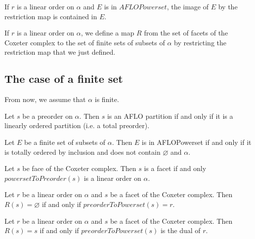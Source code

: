 \begin{sublemma}
If $r$ is a linear order on $\alpha$ and $E$ is in $AFLOPowerset$, the image of $E$ by the restriction map is contained in $E$.

\end{sublemma}

\begin{subdefi}[R]
If $r$ is a linear order on $\alpha$, we define a map $R$ from the set of facets of the Coxeter complex to the set of finite sets of
subsets of $\alpha$ by restricting the restriction map that we just defined.

\end{subdefi}


\subsection{The case of a finite set}

From now, we assume that $\alpha$ is finite.

\begin{sublemma}
Let $s$ be a preorder on $\alpha$. Then $s$ is an AFLO partition if and only if it is a linearly ordered partition (i.e. a total preorder).

\end{sublemma}

\begin{sublemma}
Let $E$ be a finite set of subsets of $\alpha$. Then $E$ is in AFLOPowerset if and only if it is totally ordered by inclusion and does not contain
$\varnothing$ and $\alpha$.

\end{sublemma}

\begin{sublemma}
Let $s$ be face of the Coxeter complex. Then $s$ is a facet if and only $powersetToPreorder(s)$ is a linear order on $\alpha$.

\end{sublemma}

\begin{sublemma}
Let $r$ be a linear order on $\alpha$ and $s$ be a facet of the Coxeter complex. Then $R(s)=\varnothing$ if and only if
$preorderToPowerset(s)=r$.

\end{sublemma}


\begin{sublemma}
Let $r$ be a linear order on $\alpha$ and $s$ be a facet of the Coxeter complex. Then $R(s)=s$ if and only if
$preorderToPowerset(s)$ is the dual of $r$.

\end{sublemma}


